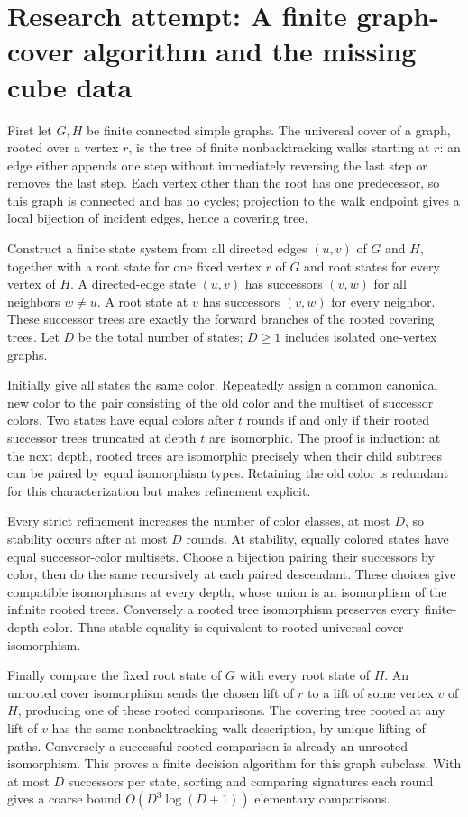 \documentclass[11pt]{article}
\begin{document}
\section{Research attempt: A finite graph-cover algorithm and the missing cube data}

First let $G,H$ be finite connected simple graphs. The universal cover of a graph, rooted over a vertex $r$, is the tree of finite nonbacktracking walks starting at $r$: an edge either appends one step without immediately reversing the last step or removes the last step. Each vertex other than the root has one predecessor, so this graph is connected and has no cycles; projection to the walk endpoint gives a local bijection of incident edges, hence a covering tree.

Construct a finite state system from all directed edges $(u,v)$ of $G$ and $H$, together with a root state for one fixed vertex $r$ of $G$ and root states for every vertex of $H$. A directed-edge state $(u,v)$ has successors $(v,w)$ for all neighbors $w\ne u$. A root state at $v$ has successors $(v,w)$ for every neighbor. These successor trees are exactly the forward branches of the rooted covering trees. Let $D$ be the total number of states; $D\geq1$ includes isolated one-vertex graphs.

Initially give all states the same color. Repeatedly assign a common canonical new color to the pair consisting of the old color and the multiset of successor colors. Two states have equal colors after $t$ rounds if and only if their rooted successor trees truncated at depth $t$ are isomorphic. The proof is induction: at the next depth, rooted trees are isomorphic precisely when their child subtrees can be paired by equal isomorphism types. Retaining the old color is redundant for this characterization but makes refinement explicit.

Every strict refinement increases the number of color classes, at most $D$, so stability occurs after at most $D$ rounds. At stability, equally colored states have equal successor-color multisets. Choose a bijection pairing their successors by color, then do the same recursively at each paired descendant. These choices give compatible isomorphisms at every depth, whose union is an isomorphism of the infinite rooted trees. Conversely a rooted tree isomorphism preserves every finite-depth color. Thus stable equality is equivalent to rooted universal-cover isomorphism.

Finally compare the fixed root state of $G$ with every root state of $H$. An unrooted cover isomorphism sends the chosen lift of $r$ to a lift of some vertex $v$ of $H$, producing one of these rooted comparisons. The covering tree rooted at any lift of $v$ has the same nonbacktracking-walk description, by unique lifting of paths. Conversely a successful rooted comparison is already an unrooted isomorphism. This proves a finite decision algorithm for this graph subclass. With at most $D$ successors per state, sorting and comparing signatures each round gives a coarse bound $O(D^3\log(D+1))$ elementary comparisons.
\end{document}
